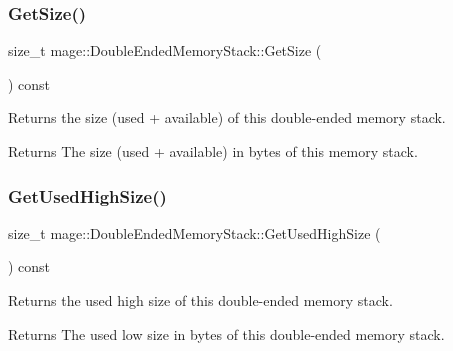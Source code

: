 \subsubsection{\texorpdfstring{Get\+Size()}{GetSize()}}
{\footnotesize\ttfamily size\+\_\+t mage\+::\+Double\+Ended\+Memory\+Stack\+::\+Get\+Size (\begin{DoxyParamCaption}{ }\end{DoxyParamCaption}) const\hspace{0.3cm}{\ttfamily [noexcept]}}

Returns the size (used + available) of this double-\/ended memory stack.

\begin{DoxyReturn}{Returns}
The size (used + available) in bytes of this memory stack. 
\end{DoxyReturn}
\mbox{\label{classmage_1_1_double_ended_memory_stack_a1c037a0084cfa806c6a519fd3208cd49}} 
\subsubsection{\texorpdfstring{Get\+Used\+High\+Size()}{GetUsedHighSize()}}
{\footnotesize\ttfamily size\+\_\+t mage\+::\+Double\+Ended\+Memory\+Stack\+::\+Get\+Used\+High\+Size (\begin{DoxyParamCaption}{ }\end{DoxyParamCaption}) const\hspace{0.3cm}{\ttfamily [noexcept]}}

Returns the used high size of this double-\/ended memory stack.

\begin{DoxyReturn}{Returns}
The used low size in bytes of this double-\/ended memory stack. 
\end{DoxyReturn}
\mbox{\label{classmage_1_1_double_ended_memory_stack_af7fd015832d8c6c56619917492e62a2e}} 
